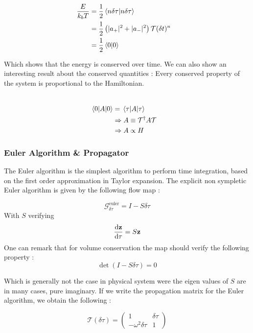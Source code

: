 \documentclass[ansiapaper]{report}
\begin{document}
\begin{multicols}{3}
	\begin{align*}
		\\ \frac{E}{k_bT} &= \frac{1}{2}\braket{n \delta \tau}{n \delta \tau}
		\\ &=\frac{1}{2}\left(\lvert a_+ \rvert^2  + \lvert a_- \rvert^2 \right)\mathcal{T}(\delta t)^n
		\\ &= \frac{1}{2} \braket{0}{0}
	\end{align*}

	Which shows that the energy is conserved over time. We can also show an interesting result about the conserved quantities : Every conserved property of the system is proportional to the Hamiltonian. 



	\begin{align*}
		\\ \expval{A}{0} &=\expval{A}{\tau}
		\\  & \Rightarrow A \equiv \mathcal{T}^\dagger A \mathcal{T}
		\\ & \Rightarrow A \propto H
	\end{align*}
    
	\subsubsection{Euler Algorithm \& Propagator}

	The Euler algorithm is the simplest algorithm to perform time integration, based on the first order approximation in Taylor expansion. The explicit non sympletic Euler algorithm is given by the following flow map :

	$$\mathcal{G}_{\delta \tau}^{\text{euler}} = I - S \delta \tau $$ With $S$ verifying $$\dv{\textbf{z} }{\tau} = S \textbf{z} $$ One can remark that for volume conservation the map should verify the following property : 
    \begin{equation}
        \det(I - S \delta \tau) =  0
        \label{eq:det_euler}
    \end{equation}

    Which is generally not the case in physical system were the eigen values of $S$ are in many cases,  pure imaginary. If we write the propagation matrix for the Euler algorithm, we obtain the following :

	$$ \mathcal{T}(\delta \tau) =
		\begin{pmatrix}
			1                     & \delta \tau \\
			-\omega^2 \delta \tau & 1
		\end{pmatrix}
	$$


\end{multicols}
\end{document}
